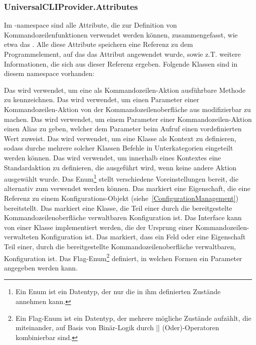 \subsubsection{UniversalCLIProvider.Attributes}
Im -namespace sind alle Attribute, die zur Definition von Kommandozeilenfunktionen verwendet werden können, zusammengefasst, wie etwa das .
Alle diese Attribute speichern eine Referenz zu dem Programmelement, auf das das Attribut angewendet wurde, sowie z.T. weitere Informationen, die sich aus dieser Referenz ergeben.
Folgende Klassen sind in diesem namespace vorhanden:
\begin{outline}
 \1 Das  wird verwendet, um eine als Kommandozeilen-Aktion ausführbare Methode zu kennzeichnen.
 \1 Das  wird verwendet, um einen Parameter einer Kommandozeilen-Aktion von der Kommandozeilenoberfläche aus modifizierbar zu machen.
 \1 Das  wird verwendet, um einem Parameter einer Kommandozeilen-Aktion einen Alias zu geben,
 welcher dem Parameter beim Aufruf einen vordefinierten Wert zuweist.
 \1 Das  wird verwendet, um eine Klasse als Kontext zu definieren, sodass durche mehrere solcher Klassen Befehle in Unterkategorien eingeteilt werden können.
 \1 Das  wird verwendet, um innerhalb eines Kontextes eine Standardaktion zu definieren, die ausgeführt wird, wenn keine andere Aktion ausgewählt wurde.
 \1 Das Enum\footnote{Ein Enum ist ein Datentyp, der nur die in ihm definierten Zustände annehmen kann.} 
 stellt verschiedene Voreinstellungen bereit, die alternativ zum  verwendet werden können.
 \1 Das  markiert eine Eigenschaft, die eine Referenz zu einem Konfigurations-Objekt (siehe~\ref{ConfigurationManagement}) bereitstellt.
 \1 Das  markiert eine Klasse, die Teil einer durch die bereitgestelte Kommandozeilenoberfläche verwaltbaren Konfiguration ist.
 \1 Das Interface  kann von einer Klasse implementiert werden, die der Ursprung einer Kommandozeilen-verwalteten Konfiguration ist.
 \1 Das  markiert, dass ein Feld oder eine Eigenschaft Teil einer, durch die bereitgestellte Kommandozeilenoberfläche verwaltbaren, Konfiguration ist.
 \1 Das Flag-Enum\footnote{Ein Flag-Enum ist ein Datentyp, der mehrere mögliche Zustände aufzählt, die miteinander, auf Basis von Binär-Logik durch || (Oder)-Operatoren kombinierbar sind.}
  definiert, in welchen Formen ein Parameter angegeben werden kann.
\end{outline}
